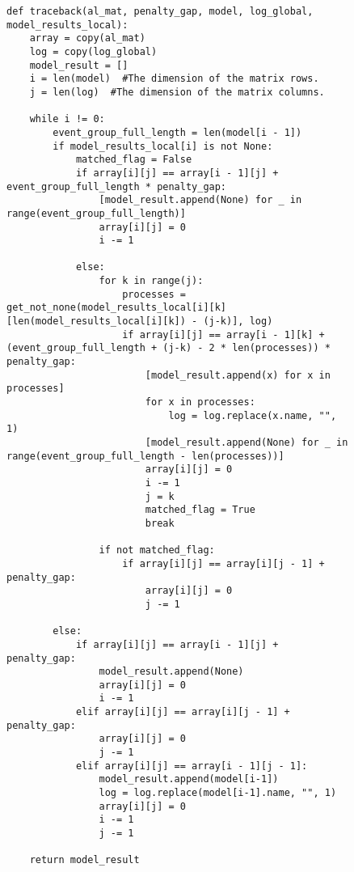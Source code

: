 \begin{figure}[!ht]
\lstset{caption=Znajdowanie ścieżki w modelu, captionpos=b}
\lstset{label=src:traceback, frame=single}
\begin{lstlisting}
def traceback(al_mat, penalty_gap, model, log_global, model_results_local):
    array = copy(al_mat)
    log = copy(log_global)
    model_result = []
    i = len(model)  #The dimension of the matrix rows.
    j = len(log)  #The dimension of the matrix columns.

    while i != 0:
        event_group_full_length = len(model[i - 1])
        if model_results_local[i] is not None:
            matched_flag = False
            if array[i][j] == array[i - 1][j] + event_group_full_length * penalty_gap:
                [model_result.append(None) for _ in range(event_group_full_length)]
                array[i][j] = 0
                i -= 1

            else:
                for k in range(j):
                    processes = get_not_none(model_results_local[i][k][len(model_results_local[i][k]) - (j-k)], log)
                    if array[i][j] == array[i - 1][k] + (event_group_full_length + (j-k) - 2 * len(processes)) * penalty_gap:
                        [model_result.append(x) for x in processes]
                        for x in processes:
                            log = log.replace(x.name, "", 1)
                        [model_result.append(None) for _ in range(event_group_full_length - len(processes))]
                        array[i][j] = 0
                        i -= 1
                        j = k
                        matched_flag = True
                        break

                if not matched_flag:
                    if array[i][j] == array[i][j - 1] + penalty_gap:
                        array[i][j] = 0
                        j -= 1

        else:
            if array[i][j] == array[i - 1][j] + penalty_gap:
                model_result.append(None)
                array[i][j] = 0
                i -= 1
            elif array[i][j] == array[i][j - 1] + penalty_gap:
                array[i][j] = 0
                j -= 1
            elif array[i][j] == array[i - 1][j - 1]:
                model_result.append(model[i-1])
                log = log.replace(model[i-1].name, "", 1)
                array[i][j] = 0
                i -= 1
                j -= 1

    return model_result
\end{lstlisting}
\end{figure}

